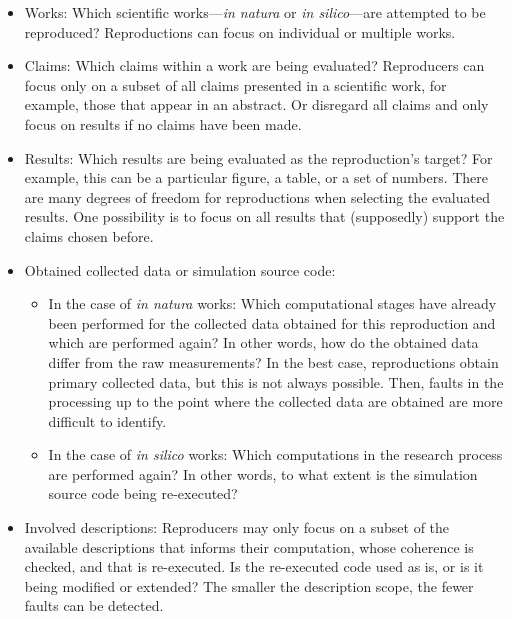 \documentclass[authordate, empirical]{jote-new-article}
\begin{document}
	\begin{itemize}


		\item Works: Which scientific works—\emph{in natura} or \emph{in silico}—are attempted to be reproduced? Reproductions can focus on individual or multiple works.



		\item
		Claims: Which claims within a work are being evaluated? Reproducers can focus only on a subset of all claims presented in a scientific work, for example, those that appear in an abstract. Or disregard all claims and only focus on results if no claims have been made.



		\item Results: Which results are being evaluated as the reproduction's target? For example, this can be a particular figure, a table, or a set of numbers. There are many degrees of freedom for reproductions when selecting the evaluated results. One possibility is to focus on all results that (supposedly) support the claims chosen before.



		\item Obtained collected data or simulation source code:

		\begin{itemize}


			\item In the case of \emph{in natura} works: Which computational stages have already been performed for the collected data obtained for this reproduction and which are performed again? In other words, how do the obtained data differ from the raw measurements? In the best case, reproductions obtain primary collected data, but this is not always possible. Then, faults in the processing up to the point where the collected data are obtained are more difficult to identify.



			\item In the case of \emph{in silico} works: Which computations in the research process are performed again? In other words, to what extent is the simulation source code being re-executed?


		\end{itemize}

		\item
		Involved descriptions: Reproducers may only focus on a subset of the available descriptions that informs their computation, whose coherence is checked, and that is re-executed. Is the re-executed code used as is, or is it being modified or extended? The smaller the description scope, the fewer faults can be detected.




\end{itemize}
\end{document}
